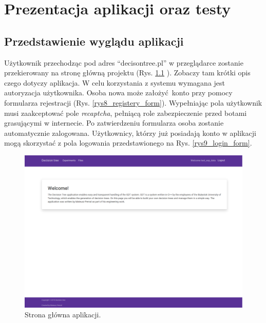 \chapter{Prezentacja aplikacji oraz testy}
\section{Przedstawienie wyglądu aplikacji}
Użytkownik przechodząc pod adres \enquote{decisontree.pl} w przeglądarce zostanie przekierowany na stronę główną projektu (Rys. \ref{rys7_home_page} ). Zobaczy tam krótki opis czego dotyczy aplikacja. W celu korzystania z systemu wymagana jest autoryzacja użytkownika. Osoba nowa może założyć konto przy pomocy formularza rejestracji (Rys. \ref{rys8_registery_form}). Wypełniając pola użytkownik musi zaakceptować pole \textit{recaptcha}, pełniącą role zabezpieczenie przed botami grasującymi w internecie. Po zatwierdzeniu formularza osoba zostanie automatycznie zalogowana. Użytkownicy, którzy już posiadają konto w aplikacji mogą skorzystać z pola logowania przedstawionego na Rys. \ref{rys9_login_form}.

\begin{figure}[htb]
	\centering
	\includegraphics[width=15cm]{grafika/home_page.eps}
	\caption{Strona główna aplikacji.}
	\label{rys7_home_page}
\end{figure}

